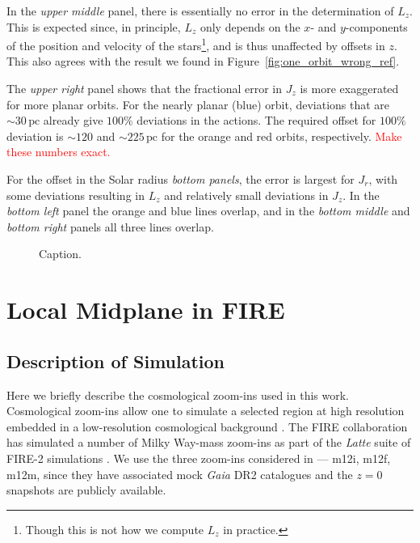 \documentclass[twocolumn]{aastex62}
\newcommand{\Gus}[1]{\textcolor{red}{#1}}
\newcommand{\pc}{\text{pc}}
\newcommand{\uth}{\textsuperscript{th}}
\begin{document}
In the {\em upper middle} panel, there is essentially no error in the
determination of $L_z$. This is expected since, in principle, $L_z$ only
depends on the $x$- and $y$-components of the position and velocity of the
stars\footnote{Though this is not how we compute $L_z$ in practice.}, and is
thus unaffected by offsets in $z$. This also agrees with the result we found
in Figure~\ref{fig:one_orbit_wrong_ref}.

The {\em upper right} panel shows that the fractional error in $J_z$ is more
exaggerated for more planar orbits. For the nearly planar (blue) orbit,
deviations that are $\sim30\,\pc$ already give $100\%$ deviations in the
actions. The required offset for $100\%$ deviation is $\sim120$ and
$\sim225\,\pc$ for the orange and red orbits, respectively. \Gus{Make these
numbers exact.}

For the offset in the Solar radius {\em bottom panels}, the error is largest
for $J_r$, with some deviations resulting in $L_z$ and relatively small
deviations in $J_z$. In the {\em bottom left} panel the orange and blue lines
overlap, and in the {\em bottom middle} and {\em bottom right} panels all
three lines overlap.

\begin{figure*}
\caption{\Gus{update figure} We report the 95\uth minus 5\uth percentile of
the error in the measured action ($\Delta J_i$) from coordinate system errors
for three orbits with low-, medium-, and high-$J_z$ values (blue, orange, and
red, respectively). The {\em left}, {\em center}, and {\em right} panels show
the result for $J_r$, $L_z$, and $J_z$, respectively. The {\em upper} panels
consider an offset in $z$ and the {\em lower} panels consider an offset in $x$
(equivalently, an offset in the Solar radius).}
\label{fig:many_orbit_wrong_ref}
\end{figure*}

\begin{figure}
\caption{Caption.}
\label{fig:Jz_hist}
\end{figure}

\section{Local Midplane in FIRE} \label{sec:local_fire}
\subsection{Description of Simulation} \label{ssec:cosmozoom}
Here we briefly describe the cosmological zoom-ins used in this work.
Cosmological zoom-ins allow one to simulate a selected region at high
resolution embedded in a low-resolution cosmological background
\citep[e.g.][]{1993ApJ...412..455K,2014MNRAS.437.1894O}. The FIRE
collaboration has simulated a number of Milky Way-mass zoom-ins as part of the
{\em Latte} suite of FIRE-2 simulations
\citep{2016ApJ...827L..23W,2018MNRAS.481.4133G}. We use the three zoom-ins
considered in \citet{2018arXiv180610564S} --- m12i, m12f, m12m, since they
have associated mock {\em Gaia} DR2 catalogues and the $z=0$ snapshots are
publicly available.
\end{document}

